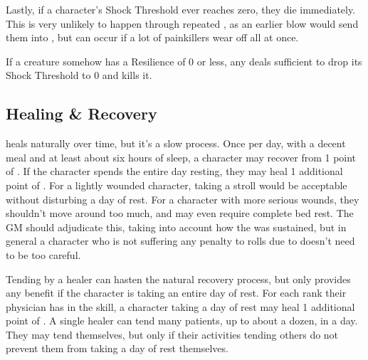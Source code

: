 Lastly, if a character's Shock Threshold ever reaches zero, they die immediately.
This is very unlikely to happen through repeated , as an earlier blow would send them into , but can occur if a lot of painkillers wear off all at once.

If a creature somehow has a Resilience of 0 or less, any  deals  sufficient to drop its Shock Threshold to 0 and kills it.

\subsection{Healing \& Recovery}

 heals naturally over time, but it's a slow process.
Once per day, with a decent meal and at least about six hours of sleep, a character may recover from 1 point of .
If the character spends the entire day resting, they may heal 1 additional point of .
For a lightly wounded character, taking a stroll would be acceptable without disturbing a day of rest.
For a character with more serious wounds, they shouldn't move around too much, and may even require complete bed rest.
The GM should adjudicate this, taking into account how the  was sustained, but in general a character who is not suffering any penalty to rolls due to  doesn't need to be too careful.

Tending by a healer can hasten the natural recovery process, but only provides any benefit if the character is taking an entire day of rest.
For each rank their physician has in the  skill, a character taking a day of rest may heal 1 additional point of .
A single healer can tend many patients, up to about a dozen, in a day.
They may tend themselves, but only if their activities tending others do not prevent them from taking a day of rest themselves.

